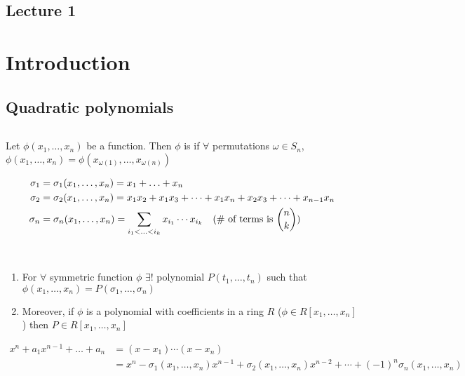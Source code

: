 \documentclass[a4paper]{article}
\begin{document}
\subsection*{Lecture 1} %
\section{Introduction}
\subsection{Quadratic polynomials}
\begin{example}[n=3]
 \(  \)
\end{example}

\begin{definition}
  Let \( \phi(x_1, \ldots, x_n) \) be a function. Then \( \phi \) is  if \( \forall \) permutations \( \omega\in S_n \), \( \phi(x_1,\ldots, x_n) = \phi(x_{\omega(1)},\ldots,x_{\omega(n)})\)
\end{definition}

\begin{definition}
  \begin{align*}
    \sigma_1 &= \sigma_1(x_1,\ldots, x_n)= x_1+\ldots+x_n \\
    \sigma_2 &= \sigma_2(x_1,\ldots, x_n)= x_1x_2+x_1x_3+\cdots+x_1x_n+x_2x_3+\cdots+x_{n-1}x_n \\
    \sigma_n &= \sigma_n(x_1,\ldots, x_n)= \sum_{i_1<\ldots<i_k} x_{i_1}\cdots x_{i_k} \quad \text{(\# of terms is \( \binom{n}{k} \))}
  \end{align*}
\end{definition}

\begin{theorem}\
  \begin{enumerate}
    \item For \( \forall \) symmetric function \( \phi \) \( \exists ! \) polynomial \( P(t_1,
      \ldots,t_n) \) such that \( \phi(x_1,\ldots,x_n) =P(\sigma_1,\ldots,\sigma_n)\)
    \item Moreover, if \( \phi \) is a polynomial with coefficients in a ring \( R \) (\( \phi\in R[x_1,\ldots, x_n] \)) then \( P\in R[x_1,\ldots, x_n] \)
  \end{enumerate}
\end{theorem}

\begin{theorem}
  \begin{align*}
    x^n+a_1x^{n-1}+\ldots+a_n &= (x-x_1)\cdots(x-x_n) \\
    &= x^n-\sigma_1(x_1,\ldots, x_n)x^{n-1}+\sigma_2(x_1,\ldots, x_n)x^{n-2}+\cdots+(-1)^n\sigma_n(x_1,\ldots, x_n)
  \end{align*}
\end{theorem}
\end{document}
